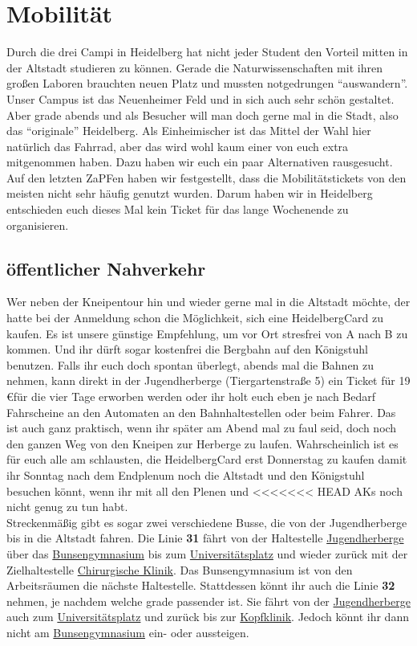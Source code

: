 \section{Mobilität}
  Durch die drei Campi in Heidelberg hat nicht jeder Student den Vorteil mitten
  in der Altstadt studieren zu können. Gerade die Naturwissenschaften mit ihren großen
  Laboren brauchten neuen Platz und mussten notgedrungen ``auswandern''. Unser Campus ist
  das Neuenheimer Feld und in sich auch sehr schön gestaltet.
  Aber grade abends und als Besucher will man doch gerne mal in die Stadt, also das
  ``originale'' Heidelberg.
  Als Einheimischer ist das Mittel der Wahl hier natürlich das Fahrrad, aber das wird wohl
  kaum einer von euch extra mitgenommen haben. Dazu haben wir euch ein paar Alternativen
  rausgesucht. Auf den letzten ZaPFen haben wir festgestellt, dass die Mobilitätstickets von den meisten
  nicht sehr häufig genutzt wurden. Darum haben wir in Heidelberg entschieden euch
  dieses Mal kein Ticket für das lange Wochenende zu organisieren.

  \subsection{öffentlicher Nahverkehr}
    Wer neben der Kneipentour hin und wieder gerne mal in die Altstadt möchte, der hatte bei
    der Anmeldung schon die Möglichkeit, sich eine HeidelbergCard zu kaufen.
    Es ist unsere günstige Empfehlung, um vor Ort stresfrei von A nach B zu kommen.
    Und ihr dürft sogar kostenfrei die Bergbahn auf den Königstuhl benutzen.
    Falls ihr euch doch spontan überlegt, abends mal die Bahnen zu nehmen, kann
    direkt in der Jugendherberge (Tiergartenstraße 5) ein Ticket für 19 \euro für die vier Tage
    erworben werden oder ihr holt euch eben je nach Bedarf Fahrscheine an den Automaten
    an den Bahnhaltestellen oder beim Fahrer.
    Das ist auch ganz praktisch, wenn ihr später am Abend mal zu faul seid, doch
    noch den ganzen Weg von den Kneipen zur Herberge zu laufen.
    Wahrscheinlich ist es für euch alle am schlausten, die HeidelbergCard erst
    Donnerstag zu kaufen damit ihr Sonntag nach dem Endplenum noch die Altstadt und
    den Königstuhl besuchen könnt, wenn ihr mit all den Plenen und
<<<<<<< HEAD
    AKs noch nicht genug zu tun habt. \\
    Streckenmäßig gibt es sogar zwei verschiedene Busse, die von der Jugendherberge
    bis in die Altstadt fahren. Die Linie \textbf{31} fährt von der Haltestelle
    \underline{Jugendherberge} über das \underline{Bunsengymnasium} bis zum
    \underline{Universitätsplatz} und wieder zurück mit der Zielhaltestelle
    \underline{Chirurgische Klinik}. Das Bunsengymnasium ist von den Arbeitsräumen
    die nächste Haltestelle. Stattdessen könnt ihr auch die Linie \textbf{32} nehmen,
    je nachdem welche grade passender ist. Sie fährt von der \underline{Jugendherberge}
    auch zum \underline{Universitätsplatz} und zurück bis zur \underline{Kopfklinik}.
    Jedoch könnt ihr dann nicht am \underline{Bunsengymnasium} ein- oder aussteigen.

